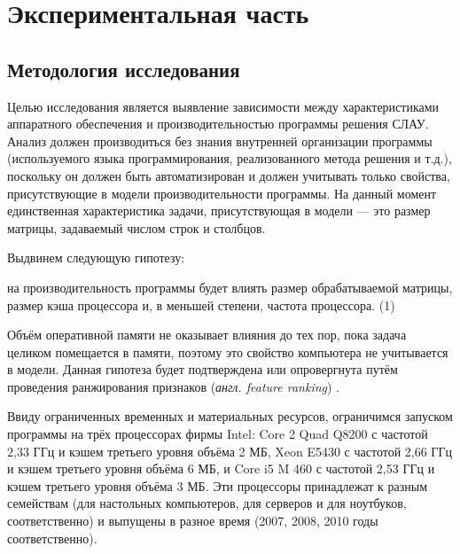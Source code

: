 \section{Экспериментальная часть}

\subsection{Методология исследования}

Целью исследования является выявление зависимости между характеристиками аппаратного обеспечения и производительностью программы решения СЛАУ. Анализ должен производиться без знания внутренней организации программы (используемого языка программирования, реализованного метода решения и т.д.), поскольку он должен быть автоматизирован и должен учитывать только свойства, присутствующие в модели производительности программы. На данный момент единственная характеристика задачи, присутствующая в модели --- это размер матрицы, задаваемый числом строк и столбцов.

Выдвинем следующую гипотезу: 

на производительность программы будет влиять размер обрабатываемой матрицы, размер кэша процессора и, в меньшей степени, частота процессора. (1)

Объём оперативной памяти не оказывает влияния до тех пор, пока задача целиком помещается в памяти, поэтому это свойство компьютера не учитывается в модели. Данная гипотеза будет подтверждена или опровергнута путём проведения ранжирования признаков (\textit{англ. feature ranking}) \cite{feature-ranking}.




Ввиду ограниченных временных и материальных ресурсов, ограничимся запуском программы на трёх процессорах фирмы Intel:  Core 2 Quad Q8200 с частотой 2,33 ГГц и кэшем третьего уровня объёма 2 МБ, Xeon E5430 с частотой 2,66 ГГц и кэшем третьего уровня объёма 6 МБ, и Core i5 M 460 с частотой 2,53 ГГц и кэшем третьего уровня объёма 3 МБ. Эти процессоры принадлежат к разным семействам (для настольных компьютеров, для серверов и для ноутбуков, соответственно) и выпущены в разное время (2007, 2008, 2010 годы соответственно).

